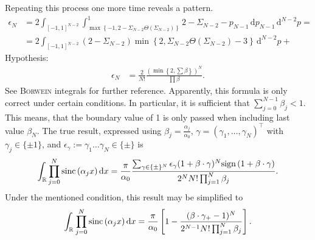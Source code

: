 \documentclass[german, parskip=full]{scrartcl}
\newcommand{\kom}{}
\newcommand{\intx}{}
\newcommand{\intr}{}
\newcommand{\kla}{}
\newcommand{\klam}{}
\newcommand{\klammer}{}
\newcommand{\tecxt}{}
\newcommand*{\sinc}{\text{sinc\,}}
\begin{document}
Repeating this process one more time reveals a pattern.
\begin{align*}
\epsilon_N&=2\intx\int_{[-1,1]^{N-2}}^{ }\intx\int_{\max\klammer\left\{{-1,2-\Sigma_{N-2}\Theta (\Sigma_{N-2})} \right\}}^{1}2-\Sigma_{N-2}-p_{N-1}\,\mathrm{d}p_{N-1}\,\mathrm{d}^{N-2}p=\\
&=2\int_{[-1,1]^{N-2}}^{ }(2-\Sigma_{N-2})\min\klammer\left\{{2,\Sigma_{N-2}\Theta (\Sigma_{N-2})-3} \right\}\,\mathrm{d}^{N-2}p+
\end{align*}
Hypothesis:
\begin{align*}
\epsilon_N&=\frac{2}{N!}\frac{\kla\left( {\min\klammer\left\{{2,\sum\beta} \right\}} \right)^N}{\prod\beta}.
\end{align*}
See \textsc{Borwein} integrals for further reference.
Apparently, this formula is only correct under certain conditions. 
In particular, it is sufficient that $\sum_{j=0}^{N-1}\beta_j<1$.
This means, that the boundary value of 1 is only passed when including last value $\beta_N$. 
The true result, expressed using $\beta_j=\frac{\alpha_j}{\alpha_0}$, $\gamma=(\gamma_1,\dots,\gamma_N)^\top$ with $\gamma_j\in\{\pm 1\}$, and $\epsilon_\gamma:=\gamma_1\dots\gamma_N\in\{\pm\}$ is
\begin{align}
\intr\int_{\mathbb{R}}\prod_{j=0}^N\sinc(\alpha_jx)\,\mathrm{d}x=\frac{\pi}{\alpha_0}\frac{\sum_{\gamma\in\{\pm\}^N}\epsilon_\gamma (1+\beta\cdot\gamma )^N\tecxt\text{sign\,}(1+\beta\cdot\gamma)}{2^N N!\prod_{j=1}^N\beta_j}. \label{eqn:IntegralProductSincSolution}
\end{align}
Under the mentioned condition, this result may be simplified to
\begin{align}
\intr\int_{\mathbb{R}^{ }}\prod_{j=0}^N\sinc(\alpha_jx)\,\mathrm{d}x=\frac{\pi}{\alpha_0}\klam\left[ 1-\frac{(\beta\cdot\gamma_+ - 1)^N}{2^{N-1} N!\prod_{j=1}^N\beta_j} \right]. \label{eqn:IntegralProductSincSolutionSimplified}
\end{align}




\end{document}
